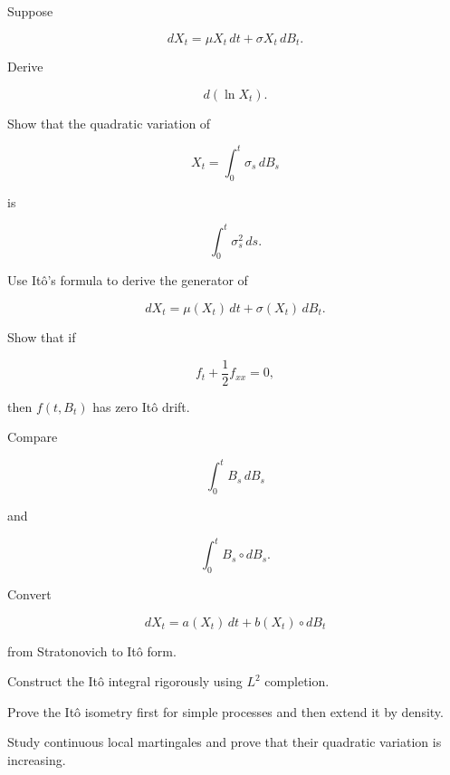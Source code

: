\begin{exercise}[3]
Suppose

\[
dX_t
=
\mu X_t\,dt
+
\sigma X_t\,dB_t.
\]

Derive

\[
d(\ln X_t).
\]
\end{exercise}

\begin{exercise}[3]
Show that the quadratic variation of

\[
X_t
=
\int_0^t
\sigma_s\,dB_s
\]

is

\[
\int_0^t
\sigma_s^2\,ds.
\]
\end{exercise}

\begin{exercise}[3]
Use It\^o's formula to derive the generator of

\[
dX_t
=
\mu(X_t)\,dt
+
\sigma(X_t)\,dB_t.
\]
\end{exercise}

\begin{exercise}[3]
Show that if

\[
f_t+\frac12f_{xx}=0,
\]

then \(f(t,B_t)\) has zero It\^o drift.
\end{exercise}

\begin{exercise}[3]
Compare

\[
\int_0^tB_s\,dB_s
\]

and

\[
\int_0^tB_s\circ dB_s.
\]
\end{exercise}

\begin{exercise}[3]
Convert

\[
dX_t
=
a(X_t)\,dt
+
b(X_t)\circ dB_t
\]

from Stratonovich to It\^o form.
\end{exercise}

\begin{exercise}[4]
Construct the It\^o integral rigorously using \(L^2\) completion.
\end{exercise}

\begin{exercise}[4]
Prove the It\^o isometry first for simple processes and then extend it by
density.
\end{exercise}

\begin{exercise}[4]
Study continuous local martingales and prove that their quadratic
variation is increasing.
\end{exercise}

